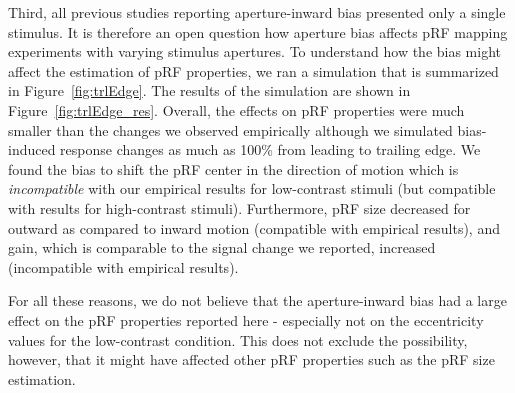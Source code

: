 Third, all previous studies reporting aperture-inward bias presented only a single stimulus. It is therefore an open question how aperture bias affects pRF mapping experiments with varying stimulus apertures. To understand how the bias might affect the estimation of pRF properties, we ran a simulation that is summarized in Figure~\ref{fig:trlEdge}. The results of the simulation are shown in Figure~\ref{fig:trlEdge_res}. Overall, the effects on pRF properties were much smaller than the changes we observed empirically although we simulated bias-induced response changes as much as 100\% from leading to trailing edge. We found the bias to shift the pRF center in the direction of motion which is \textit{incompatible} with our empirical results for low-contrast stimuli (but compatible with results for high-contrast stimuli). Furthermore, pRF size decreased for outward as compared to inward motion (compatible with empirical results), and gain, which is comparable to the signal change we reported, increased (incompatible with empirical results).

For all these reasons, we do not believe that the aperture-inward bias had a large effect on the pRF properties reported here - especially not on the eccentricity values for the low-contrast condition. This does not exclude the possibility, however, that it might have affected other pRF properties such as the pRF size estimation.

